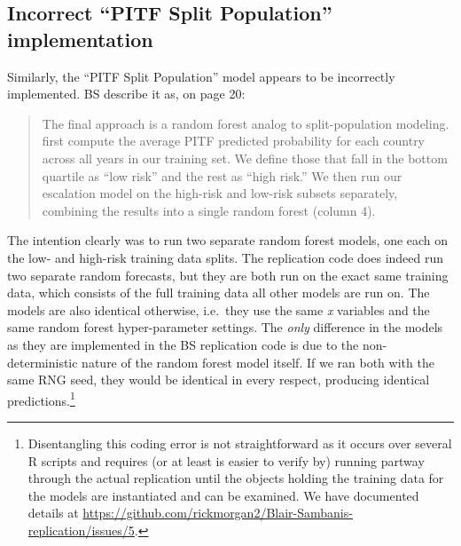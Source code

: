 \documentclass[]{article}
\let\rmarkdownfootnote\footnote%
\def\footnote{\protect\rmarkdownfootnote}
\begin{document}
\hypertarget{incorrect-pitf-split-population-implementation}{%
\subsection{Incorrect ``PITF Split Population''
implementation}\label{incorrect-pitf-split-population-implementation}}

Similarly, the ``PITF Split Population'' model appears to be incorrectly
implemented. BS describe it as, on page 20:

\begin{quote}
The final approach is a random forest analog to split-population
modeling. first compute the average PITF predicted probability for each
country across all years in our training set. We define those that fall
in the bottom quartile as ``low risk'' and the rest as ``high risk.'' We
then run our escalation model on the high-risk and low-risk subsets
separately, combining the results into a single random forest (column
4).
\end{quote}

The intention clearly was to run two separate random forest models, one
each on the low- and high-risk training data splits. The replication
code does indeed run two separate random forecasts, but they are both
run on the exact same training data, which consists of the full training
data all other models are run on. The models are also identical
otherwise, i.e.~they use the same \emph{x} variables and the same random
forest hyper-parameter settings. The \emph{only} difference in the
models as they are implemented in the BS replication code is due to the
non-deterministic nature of the random forest model itself. If we ran
both with the same RNG seed, they would be identical in every respect,
producing identical predictions.\footnote{Disentangling this coding
  error is not straightforward as it occurs over several R scripts and
  requires (or at least is easier to verify by) running partway through
  the actual replication until the objects holding the training data for
  the models are instantiated and can be examined. We have documented
  details at
  \url{https://github.com/rickmorgan2/Blair-Sambanis-replication/issues/5}.}
\end{document}
